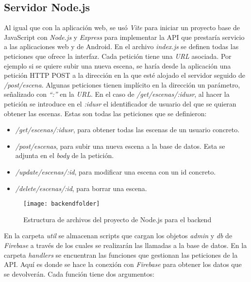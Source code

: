 \subsection{Servidor Node.js}

Al igual que con la aplicación web, se usó \textit{Vite} para iniciar un proyecto base de JavaScript con \textit{Node.js}\cite{nodejs} y \textit{Express}\cite{express} para implementar la API que prestaría servicio a las aplicaciones web y de Android. En el archivo \textit{index.js} se definen todas las peticiones que ofrece la interfaz. Cada petición tiene una \textit{URL} asociada. Por ejemplo si se quiere subir una nueva escena, se haría desde la aplicación una petición HTTP POST a la dirección en la que esté alojado el servidor seguido de \textit{/post/escena}. Algunas peticiones tienen implícito en la dirección un parámetro, señalizado con \textit{``:''} en la \textit{URL}. En el caso de \textit{/get/escenas/:idusr}, al hacer la petición se introduce en el \textit{:idusr} el identificador de usuario del que se quieran obtener las escenas. Estas son todas las peticiones que se definieron:

\begin{itemize}
    \item \textit{/get/escenas/:idusr}, para obtener todas las escenas de un usuario concreto.
    \item \textit{/post/escenas}, para subir una nueva escena a la base de datos. Esta se adjunta en el \textit{body} de la petición.
    \item \textit{/update/escenas/:id}, para modificar una escena con un id concreto.
    \item \textit{/delete/escenas/:id}, para borrar una escena.
\end{itemize}

\begin{figure}[h]
    \centering
    \texttt{[image: backendfolder]}
    \caption[Estructura de archivos de backend]{Estructura de archivos del proyecto de Node.js para el backend}
    \label{fig:backendfolder}
\end{figure}

En la carpeta \textit{util} se almacenan scripts que cargan los objetos \textit{admin} y \textit{db} de \textit{Firebase} a través de los cuales se realizarán las llamadas a la base de datos. En la carpeta \textit{handlers} se encuentran las funciones que gestionan las peticiones de la API. Aquí es donde se hace la conexión con \textit{Firebase} para obtener los datos que se devolverán. Cada función tiene dos argumentos:

